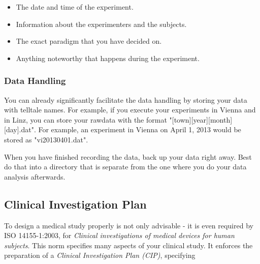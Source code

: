 \begin{itemize}
  \item The date and time of the experiment.
  \item Information about the experimenters and the subjects.
  \item The exact paradigm that you have decided on.
  \item Anything noteworthy that happens during the experiment.
\end{itemize}

\subsubsection{Data Handling}
You can already significantly facilitate the data handling by storing your data with telltale names. For example, if you execute your experiments in Vienna and in Linz, you can store your rawdata with the format "[town][year][month][day].dat". For example, an experiment in Vienna on April 1, 2013 would be stored as "vi20130401.dat".

When you have finished recording the data, back up your data right away. Best do that into a directory that is separate from the one where you do your data analysis afterwards.

\subsection{Clinical Investigation Plan}

To design a medical study properly is not only advisable - it is even required by ISO 14155-1:2003, for \emph{Clinical investigations of medical devices for human subjects}. This norm specifies many aspects of your clinical study. It enforces the preparation of a \emph{Clinical Investigation Plan (CIP)}, specifying


